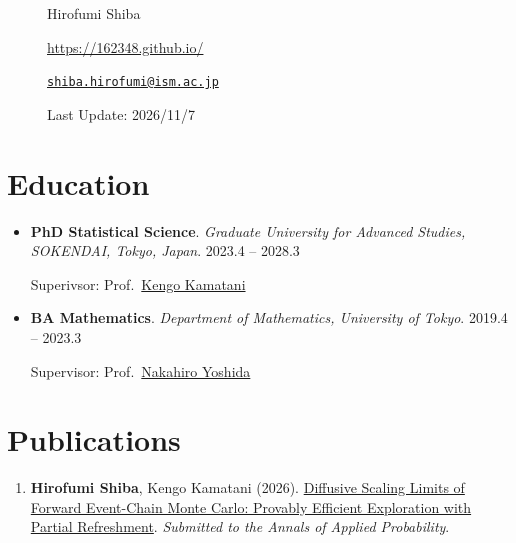 \documentclass[
  11pt,
]{article}
\date{}
\providecommand{\tightlist}{%
  \setlength{\itemsep}{0pt}\setlength{\parskip}{0pt}}\usepackage{longtable,booktabs,array}
\renewcommand{\labelitemi}{\textcolor{minty}{\faCheckCircle}} %
\begin{document}
\begin{figure}

\begin{minipage}{0.50\linewidth}
\Huge Hirofumi Shiba\end{minipage}%
%
\begin{minipage}{0.50\linewidth}

\color{minty}

\hfill {} \url{https://162348.github.io/}

\par

\hfill {}
\href{mailto:shiba.hirofumi@ism.ac.jp}{\nolinkurl{shiba.hirofumi@ism.ac.jp}}

\par

\color{gray}\hfill {Last Update: 2026/11/7}\end{minipage}%

\end{figure}%

\vspace{-1em}

\section{Education}\label{education}

\renewcommand{\labelitemi}{\textcolor{minty}{\faGraduationCap}}

\begin{itemize}
\item
  \textbf{PhD Statistical Science}. \emph{Graduate University for
  Advanced Studies, SOKENDAI, Tokyo, Japan}. \hfill {2023.4 -- 2028.3}

  Superivsor:
  Prof.~\href{https://sites.google.com/view/kengokamatani/home}{Kengo
  Kamatani}
\item
  \textbf{BA Mathematics}. \emph{Department of Mathematics, University
  of Tokyo}. \hfill {2019.4 -- 2023.3}

  Supervisor:
  Prof.~\href{https://www.ms.u-tokyo.ac.jp/~nakahiro/hp-naka-e}{Nakahiro
  Yoshida}
\end{itemize}

\section{Publications}\label{publications}

\begin{enumerate}
\def\labelenumi{\arabic{enumi}.}
\tightlist
\item
  \textbf{Hirofumi Shiba}, Kengo Kamatani (2026).
  \href{https://arxiv.org/abs/2602.17087}{Diffusive Scaling Limits of
  Forward Event-Chain Monte Carlo: Provably Efficient Exploration with
  Partial Refreshment}. \emph{Submitted to the Annals of Applied
  Probability}.
\end{enumerate}
\end{document}
